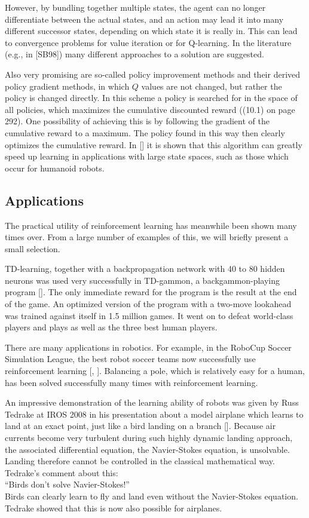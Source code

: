 \documentclass[10pt]{book}
\begin{document}
However, by bundling together multiple states, the agent can no longer differentiate between the actual states, and an action may lead it into many different successor states, depending on which state it is really in. This can lead to convergence problems for value iteration or for Q-learning. In the literature (e.g., in [SB98]) many different approaches to a solution are suggested.

Also very promising are so-called policy improvement methods and their derived policy gradient methods, in which $Q$ values are not changed, but rather the policy is changed directly. In this scheme a policy is searched for in the space of all policies, which maximizes the cumulative discounted reward ((10.1) on page 292). One possibility of achieving this is by following the gradient of the cumulative reward to a maximum. The policy found in this way then clearly optimizes the cumulative reward. In [\cite{peters2008pg}] it is shown that this algorithm can greatly speed up learning in applications with large state spaces, such as those which occur for humanoid robots.

\subsection{Applications}
The practical utility of reinforcement learning has meanwhile been shown many times over. From a large number of examples of this, we will briefly present a small selection.

TD-learning, together with a backpropagation network with 40 to 80 hidden neurons was used very successfully in TD-gammon, a backgammon-playing program [\cite{tesauro1995tdgammon}]. The only immediate reward for the program is the result at the end of the game. An optimized version of the program with a two-move lookahead was trained against itself in 1.5 million games. It went on to defeat world-class players and plays as well as the three best human players.

There are many applications in robotics. For example, in the RoboCup Soccer Simulation League, the best robot soccer teams now successfully use reinforcement learning [\cite{stone2005keepaway}, \cite{robocupsimulator}]. Balancing a pole, which is relatively easy for a human, has been solved successfully many times with reinforcement learning.

An impressive demonstration of the learning ability of robots was given by Russ Tedrake at IROS 2008 in his presentation about a model airplane which learns to land at an exact point, just like a bird landing on a branch [\cite{tedrake2008control}]. Because air currents become very turbulent during such highly dynamic landing approach, the associated differential equation, the Navier-Stokes equation, is unsolvable. Landing therefore cannot be controlled in the classical mathematical way. Tedrake's comment about this:\\
``Birds don't solve Navier-Stokes!''\\
Birds can clearly learn to fly and land even without the Navier-Stokes equation. Tedrake showed that this is now also possible for airplanes.
\end{document}
